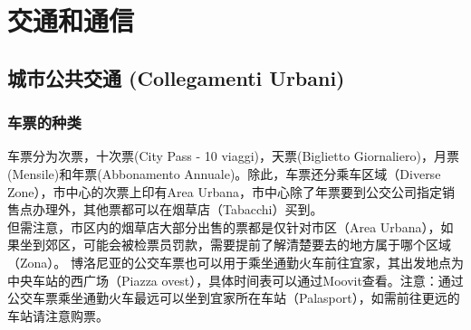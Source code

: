 
% 


\chapter{交通和通信}                 %

\section{城市公共交通 (Collegamenti Urbani)}

\subsection{车票的种类}
车票分为次票，十次票(City Pass - 10 viaggi)，天票(Biglietto Giornaliero)，月票(Mensile)和年票(Abbonamento Annuale)。除此，车票还分乘车区域（Diverse Zone），市中心的次票上印有Area Urbana，市中心除了年票要到公交公司指定销售点办理外，其他票都可以在烟草店（Tabacchi）买到。\\
但需注意，市区内的烟草店大部分出售的票都是仅针对市区（Area Urbana），如果坐到郊区，可能会被检票员罚款，需要提前了解清楚要去的地方属于哪个区域（Zona）。
博洛尼亚的公交车票也可以用于乘坐通勤火车前往宜家，其出发地点为中央车站的西广场（Piazza ovest），具体时间表可以通过Moovit查看。注意：通过公交车票乘坐通勤火车最远可以坐到宜家所在车站（Palasport），如需前往更远的车站请注意购票。

